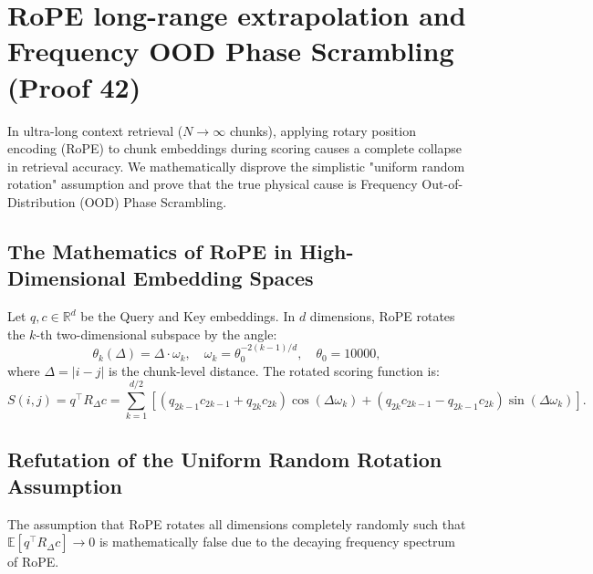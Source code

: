 \documentclass[11pt]{article}
\newcommand{\E}{\mathbb{E}}
\begin{document}
\section{RoPE long-range extrapolation and Frequency OOD Phase Scrambling (Proof 42)}
\label{app:proof42}

In ultra-long context retrieval ($N \to \infty$ chunks), applying rotary position encoding (RoPE) to chunk embeddings during scoring causes a complete collapse in retrieval accuracy. We mathematically disprove the simplistic "uniform random rotation" assumption and prove that the true physical cause is Frequency Out-of-Distribution (OOD) Phase Scrambling.

\subsection{The Mathematics of RoPE in High-Dimensional Embedding Spaces}

Let $q, c \in \mathbb{R}^d$ be the Query and Key embeddings. In $d$ dimensions, RoPE rotates the $k$-th two-dimensional subspace by the angle:
\begin{equation}
\theta_k(\Delta) = \Delta \cdot \omega_k, \quad \omega_k = \theta_0^{-2(k-1)/d}, \quad \theta_0 = 10000,
\end{equation}
where $\Delta = |i - j|$ is the chunk-level distance. The rotated scoring function is:
\begin{equation}
S(i, j) = q^\top R_{\Delta} c = \sum_{k=1}^{d/2} \left[ (q_{2k-1} c_{2k-1} + q_{2k} c_{2k}) \cos(\Delta \omega_k) + (q_{2k} c_{2k-1} - q_{2k-1} c_{2k}) \sin(\Delta \omega_k) \right].
\end{equation}

\subsection{Refutation of the Uniform Random Rotation Assumption}

The assumption that RoPE rotates all dimensions completely randomly such that $\E[q^\top R_\Delta c] \to 0$ is mathematically false due to the decaying frequency spectrum of RoPE.
\end{document}
